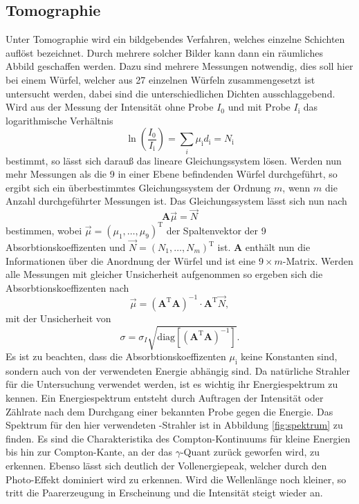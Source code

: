 \subsection{Tomographie}
\label{sec:Tomo}
Unter Tomographie wird ein bildgebendes Verfahren, welches einzelne Schichten auflöst bezeichnet. Durch mehrere solcher Bilder kann dann ein räumliches 
Abbild geschaffen werden. Dazu sind mehrere Messungen notwendig, dies soll hier bei einem 
Würfel, welcher aus \num{27} einzelnen Würfeln zusammengesetzt ist untersucht werden, dabei sind die unterschiedlichen Dichten ausschlaggebend.
Wird aus der Messung der Intensität ohne Probe $I_0$ und mit Probe $I_\text{i}$ das logarithmische Verhältnis
\begin{equation}
    \label{eqn:Verhältnis}
    \ln\left(\frac{I_0}{I_\text{i}}\right) = \sum_i \mu_\text{i} d_\text{i} = N_\text{i}
\end{equation}
bestimmt, so lässt sich darauß das lineare Gleichungssystem lösen. Werden nun mehr Messungen als die \num{9} in einer Ebene befindenden Würfel durchgeführt, 
so ergibt sich ein überbestimmtes Gleichungssystem der Ordnung $m$, wenn $m$ die Anzahl durchgeführter Messungen ist.
Das Gleichungssystem lässt sich nun nach
\begin{equation}
    \label{eqn:Gleichungssystem}
    \textbf{A} \vec{\mu} = \vec{N}
\end{equation}
bestimmen, wobei $\vec{\mu} = (\mu_1, \ldots,\mu_9)^\text{T}$ der Spaltenvektor der \num{9} Absorbtionskoeffizenten und $\vec{N} = (N_1, \ldots,N_m)^\text{T}$ ist. 
\textbf{A} enthält nun die Informationen über die Anordnung der Würfel und ist eine $9 \times m$-Matrix. Werden alle Messungen mit gleicher Unsicherheit 
aufgenommen so ergeben sich die Absorbtionskoeffizenten nach
\begin{equation}
    \label{eqn:Absorbtionskoeffizenten}
    \vec{\mu} = (\textbf{A}^\text{T} \textbf{A})^{-1} \cdot \textbf{A}^\text{T} \vec{N},
\end{equation}
mit der Unsicherheit von
\begin{equation}
    \label{eqn:Unsicherheit}
    \sigma = \sigma_I\sqrt{\text{diag}[(\textbf{A}^\text{T} \textbf{A})^{-1}]}.
\end{equation}
Es ist zu beachten, dass die Absorbtionskoeffizenten $\mu_\text{i}$ keine Konstanten sind, sondern auch von der verwendeten Energie abhängig sind. 
Da natürliche Strahler für die Untersuchung verwendet werden, ist es wichtig ihr Energiespektrum zu kennen. Ein Energiespektrum entsteht durch Auftragen der 
Intensität oder Zählrate nach dem Durchgang einer bekannten Probe gegen die Energie. Das Spektrum für den hier verwendeten -Strahler ist in Abbildung \ref{fig:spektrum} zu finden.
Es sind die Charakteristika des Compton-Kontinuums für kleine Energien bis hin zur Compton-Kante, an der das $\gamma$-Quant zurück geworfen wird, zu erkennen. 
Ebenso lässt sich deutlich der Vollenergiepeak, welcher durch den Photo-Effekt dominiert wird zu erkennen. Wird die Wellenlänge noch kleiner, so tritt die Paarerzeugung
in Erscheinung und die Intensität steigt wieder an.

